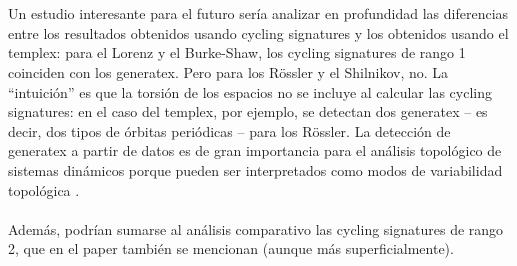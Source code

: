 \documentclass[12pt,a4paper]{article}
\begin{document}
\\
\\
Un estudio interesante para el futuro sería analizar en profundidad las diferencias entre los resultados obtenidos usando cycling signatures y los obtenidos usando el templex: para el Lorenz y el Burke-Shaw, los cycling signatures de rango 1 coinciden con los generatex. Pero para los Rössler y el Shilnikov, no. La ``intuición'' es que la torsión de los espacios no se incluye al calcular las cycling signatures: en el caso del templex, por ejemplo, se detectan dos generatex -- es decir, dos tipos de órbitas periódicas -- para los Rössler. La detección de generatex a partir de datos es de gran importancia para el análisis topológico de sistemas dinámicos porque pueden ser interpretados como modos de variabilidad topológica \cite{templex-applied}. 
\\
\\
Además, podrían sumarse al análisis comparativo las cycling signatures de rango 2, que en el paper también se mencionan (aunque más superficialmente).
\newpage
\end{document}
